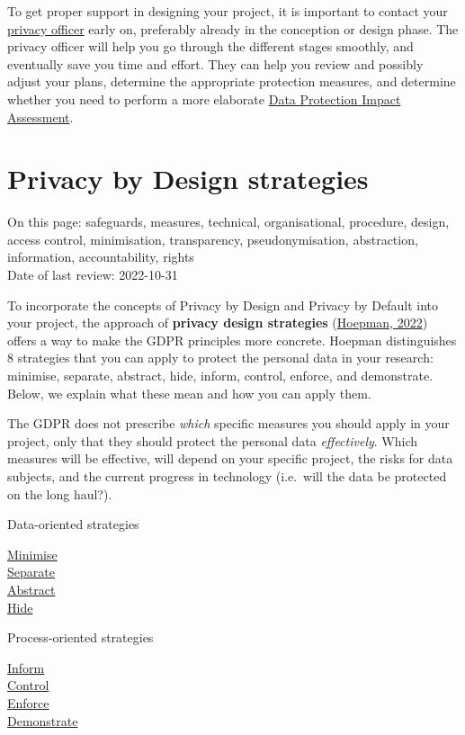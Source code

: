 \documentclass[
]{book}
\begin{document}
To get proper support in designing your project, it is important to contact your
\protect\hyperlink{support}{privacy officer} early on, preferably already in the conception or design phase. The privacy
officer will help you go through the different stages smoothly, and eventually
save you time and effort. They can help you review and possibly adjust your
plans, determine the appropriate protection measures, and determine whether you
need to perform a more elaborate \protect\hyperlink{dpia}{Data Protection Impact Assessment}.

\hypertarget{design-strategies}{%
\section{Privacy by Design strategies}\label{design-strategies}}

On this page: safeguards, measures, technical, organisational, procedure,
design, access control, minimisation, transparency, pseudonymisation,
abstraction, information, accountability, rights\\
Date of last review: 2022-10-31

To incorporate the concepts of Privacy by Design and Privacy by Default into
your project, the approach of \textbf{privacy design strategies}
(\href{https://www.cs.ru.nl/~jhh/publications/pds-booklet.pdf}{Hoepman, 2022})
offers a way to make the GDPR principles more concrete. Hoepman distinguishes 8
strategies that you can apply to protect the personal data in your research:
minimise, separate, abstract, hide, inform, control, enforce, and demonstrate.
Below, we explain what these mean and how you can apply them.

The GDPR does not prescribe \emph{which} specific measures you should apply in your
project, only that they should protect the personal data \emph{effectively}. Which
measures will be effective, will depend on your specific project, the risks for
data subjects, and the current progress in technology (i.e.~will the data be
protected on the long haul?).

Data-oriented strategies

\protect\hyperlink{minimise}{Minimise}\\
\protect\hyperlink{separate}{Separate}\\
\protect\hyperlink{abstract}{Abstract}\\
\protect\hyperlink{hide}{Hide}

Process-oriented strategies

\protect\hyperlink{inform}{Inform}\\
\protect\hyperlink{control}{Control}\\
\protect\hyperlink{enforce}{Enforce}\\
\protect\hyperlink{demonstrate}{Demonstrate}
\end{document}
